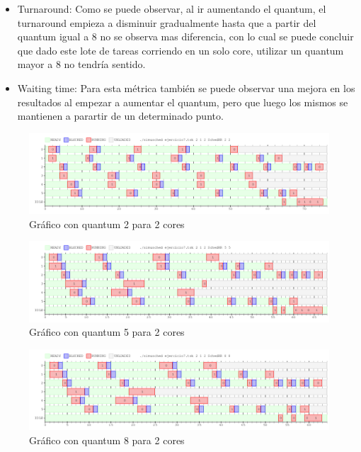 \documentclass[a4paper,11pt]{article}
\begin{document}
\begin{itemize}
\item Turnaround: Como se puede observar, al ir aumentando el quantum, el turnaround empieza a disminuir gradualmente hasta que a partir del quantum igual a 8 no se observa mas diferencia, con lo cual se puede concluir que dado este lote de tareas corriendo en un solo core, utilizar un quantum mayor a 8 no tendría sentido.
\item Waiting time: Para esta métrica también se puede observar una mejora en los resultados al empezar a aumentar el quantum, pero que luego los mismos se mantienen a parartir de un determinado punto.
\end{itemize}

\begin{figure}[H]
\centering
\includegraphics[scale=.6, width=1\textwidth]{graficos/ej7-2core-q1}
\caption{Gráfico con quantum 2 para 2 cores}
\end{figure}

\begin{figure}[H]
\centering
\includegraphics[scale=.6, width=1\textwidth]{graficos/ej7-2core-q2}
\caption{Gráfico con quantum 5 para 2 cores}
\end{figure}

\begin{figure}[H]
\centering
\includegraphics[scale=.6, width=1\textwidth]{graficos/ej7-2core-q3}
\caption{Gráfico con quantum 8 para 2 cores}
\end{figure}
\end{document}
